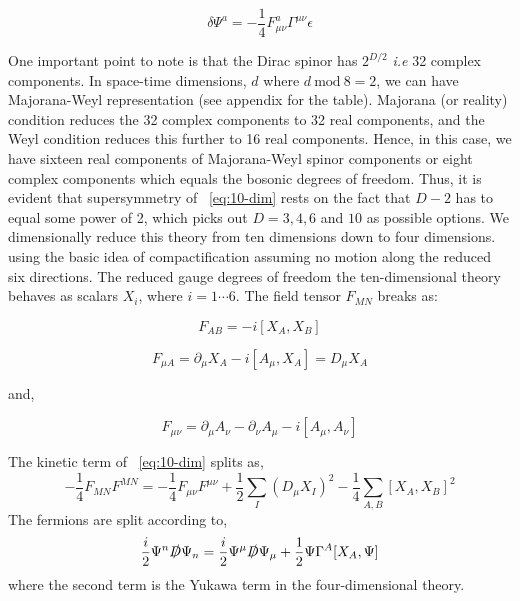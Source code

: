 \begin{equation}
\delta \Psi^{a} = -\frac{1}{4}F_{\mu\nu}^{a} \Gamma^{\mu \nu} \epsilon
\end{equation}


One important point to note is that the Dirac spinor has $2^{D/2}$ \emph{i.e} 32 complex components. 
In space-time dimensions, $d$ where $ d ~ \text{mod} ~ 8 = 2$, we can have 
Majorana-Weyl representation (see appendix for the table). Majorana (or reality) condition reduces the 
32 complex components to 32 real components, and the Weyl condition reduces this further to 16 real components. 
Hence, in this case, we have sixteen real components of Majorana-Weyl spinor components or eight complex components
which equals the bosonic degrees of freedom. Thus, it is evident that supersymmetry of ~\ref{eq:10-dim} rests on the fact
that $D-2$ has to equal some power of 2, which picks out $D=3,4,6$ and $10$ as possible options. 
We dimensionally reduce this theory from ten dimensions down to four dimensions. 
using the basic idea of compactification assuming no motion along the reduced six directions. 
The reduced gauge degrees of freedom the ten-dimensional theory 
behaves as scalars $X_{i}$, where $ i = 1 \cdots 6$. 
The field tensor $F_{MN}$ breaks as: 


\begin{equation}
F_{AB} = -i[X_{A}, X_{B}] 
\end{equation}

\begin{equation}
F_{\mu A} = \partial_{\mu} X_{A} -i [A_{\mu}, X_{A}]  = D_{\mu} X_{A} 
\end{equation}

and, 

\begin{equation}
F_{\mu \nu} = \partial_{\mu} A_{\nu} - \partial_{\nu} A_{\mu} -i [A_{\mu}, A_{\nu}] 
\end{equation}

The kinetic term of ~\ref{eq:10-dim} splits as, 
\begin{equation}
-\frac{1}{4} F_{MN}F^{MN} = -\frac{1}{4} F_{\mu\nu}F^{\mu\nu} + \frac{1}{2} \sum_{I} (D_{\mu} X_{I})^{2}   - \frac{1}{4} \sum_{A,B} [X_{A}, X_{B}]^{2} 
\end{equation}
The fermions are split according to, 
\begin{equation}
\frac{i}{2} \Psi^{n} \slashed{D} \Psi_{n} = \frac{i}{2} \Psi^{\mu} \slashed{D} \Psi_{\mu} + \frac{1}{2} \Psi \Gamma^{A}[X_{A}, \Psi] 
\end{equation}
where the second term is the Yukawa term in the four-dimensional theory. 



